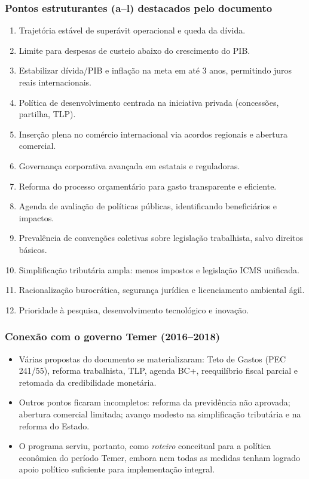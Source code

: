 \documentclass[a4paper,12pt]{article}[abntex2]
\begin{document}
\subsubsection{\textbf{Pontos estruturantes (a–l) destacados pelo documento}}
\begin{enumerate}
    \item Trajetória estável de superávit operacional e queda da dívida.  
    \item Limite para despesas de custeio abaixo do crescimento do PIB.  
    \item Estabilizar dívida/PIB e inflação na meta em até 3 anos, permitindo juros reais internacionais.  
    \item Política de desenvolvimento centrada na iniciativa privada (concessões, partilha, TLP).  
    \item Inserção plena no comércio internacional via acordos regionais e abertura comercial.  
    \item Governança corporativa avançada em estatais e reguladoras.  
    \item Reforma do processo orçamentário para gasto transparente e eficiente.  
    \item Agenda de avaliação de políticas públicas, identificando beneficiários e impactos.  
    \item Prevalência de convenções coletivas sobre legislação trabalhista, salvo direitos básicos.  
    \item Simplificação tributária ampla: menos impostos e legislação ICMS unificada.  
    \item Racionalização burocrática, segurança jurídica e licenciamento ambiental ágil.  
    \item Prioridade à pesquisa, desenvolvimento tecnológico e inovação.
\end{enumerate}

\subsubsection{\textbf{Conexão com o governo Temer (2016–2018)}}
\begin{itemize}
    \item Várias propostas do documento se materializaram: Teto de Gastos (PEC 241/55), reforma trabalhista, TLP, agenda BC+, reequilíbrio fiscal parcial e retomada da credibilidade monetária.  
    \item Outros pontos ficaram incompletos: reforma da previdência não aprovada; abertura comercial limitada; avanço modesto na simplificação tributária e na reforma do Estado.  
    \item O programa serviu, portanto, como \emph{roteiro} conceitual para a política econômica do período Temer, embora nem todas as medidas tenham logrado apoio político suficiente para implementação integral.
\end{itemize}
\end{document}
